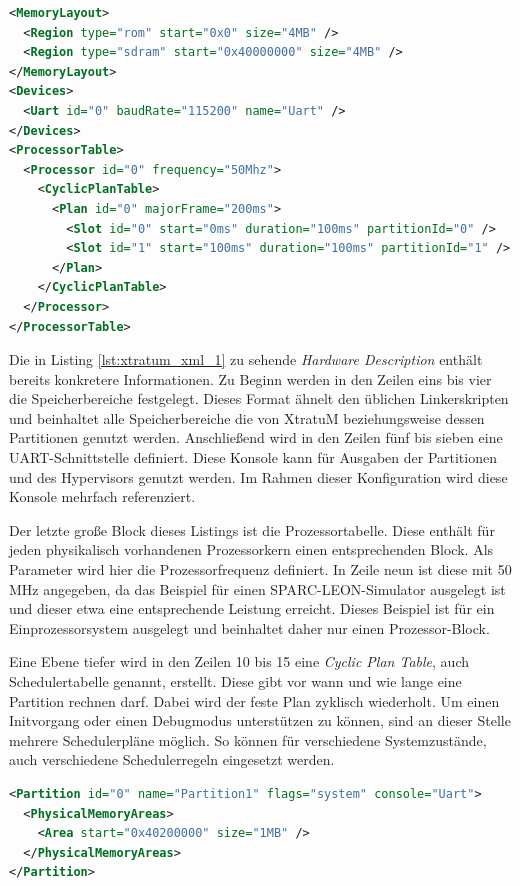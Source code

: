 \documentclass[
  a4paper,					    %
  twoside,
  DIV=calc,     				%
  bibliography=totoc,
  cleardoublepage=empty,
  ngerman,     					%
  final       					%
]{scrbook}
\begin{document}
\begin{lstlisting}[frame=single, language=XML, basicstyle=\footnotesize, caption={XtratuM Hardware Description}, label={lst:xtratum_xml_1}]
<MemoryLayout>
  <Region type="rom" start="0x0" size="4MB" />
  <Region type="sdram" start="0x40000000" size="4MB" />
</MemoryLayout>
<Devices>
  <Uart id="0" baudRate="115200" name="Uart" />
</Devices>
<ProcessorTable>
  <Processor id="0" frequency="50Mhz">
    <CyclicPlanTable>
      <Plan id="0" majorFrame="200ms">
        <Slot id="0" start="0ms" duration="100ms" partitionId="0" />
        <Slot id="1" start="100ms" duration="100ms" partitionId="1" />
      </Plan>
    </CyclicPlanTable>
  </Processor>
</ProcessorTable>
\end{lstlisting}

Die in Listing \ref{lst:xtratum_xml_1} zu sehende \emph{Hardware Description} enthält bereits konkretere Informationen. Zu Beginn werden in den Zeilen eins bis vier die Speicherbereiche festgelegt. Dieses Format ähnelt den üblichen Linkerskripten und beinhaltet alle Speicherbereiche die von XtratuM beziehungsweise dessen Partitionen genutzt werden. Anschließend wird in den Zeilen fünf bis sieben eine UART-Schnittstelle definiert. Diese Konsole kann für Ausgaben der Partitionen und des Hypervisors genutzt werden. Im Rahmen dieser Konfiguration wird diese Konsole mehrfach referenziert.

Der letzte große Block dieses Listings ist die Prozessortabelle. Diese enthält für jeden physikalisch vorhandenen Prozessorkern einen entsprechenden Block. Als Parameter wird hier die Prozessorfrequenz definiert. In Zeile neun ist diese mit 50 MHz angegeben, da das Beispiel für einen SPARC-LEON-Simulator ausgelegt ist und dieser etwa eine entsprechende Leistung erreicht. Dieses Beispiel ist für ein Einprozessorsystem ausgelegt und beinhaltet daher nur einen Prozessor-Block.

Eine Ebene tiefer wird in den Zeilen 10 bis 15 eine \emph{Cyclic Plan Table}, auch Schedulertabelle genannt, erstellt. Diese gibt vor wann und wie lange eine Partition rechnen darf. Dabei wird der feste Plan zyklisch wiederholt. Um einen Initvorgang oder einen Debugmodus unterstützen zu können, sind an dieser Stelle mehrere Schedulerpläne möglich. So können für verschiedene Systemzustände, auch verschiedene Schedulerregeln eingesetzt werden.

\begin{lstlisting}[frame=single, language=XML, basicstyle=\footnotesize, caption={XtratuM Partition Table}, label={lst:xtratum_xml_2}]
<Partition id="0" name="Partition1" flags="system" console="Uart">
  <PhysicalMemoryAreas>
    <Area start="0x40200000" size="1MB" />
  </PhysicalMemoryAreas>
</Partition>
\end{lstlisting}
\end{document}

